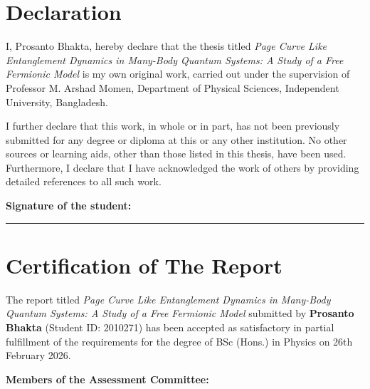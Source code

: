 \documentclass[12pt,oneside,openright]{report}
\theoremstyle{definition}
\theoremstyle{plain}
\theoremstyle{remark}
\begin{document}

\chapter*{Declaration}

I, Prosanto Bhakta, hereby declare that the thesis titled
\textit{Page Curve Like Entanglement Dynamics in Many-Body Quantum Systems: A Study of a Free Fermionic Model}
is my own original work, carried out under the supervision of Professor M. Arshad Momen,
Department of Physical Sciences, Independent University, Bangladesh.

I further declare that this work, in whole or in part, has not been previously submitted
for any degree or diploma at this or any other institution.
No other sources or learning aids, other than those listed in this thesis, have been used.
Furthermore, I declare that I have acknowledged the work of others by providing detailed references to all such work.

\vspace{2cm}

\noindent\begin{minipage}[t]{0.48\textwidth}
\textbf{Signature of the student:}\\[1.2cm]
\end{minipage}\hfill
\begin{minipage}[t]{0.40\textwidth}
\rule{0.9\linewidth}{0.4pt}
\end{minipage}

\cleardoublepage



\chapter*{Certification of The Report}

The report titled
\textit{Page Curve Like Entanglement Dynamics in Many-Body Quantum Systems: A Study of a Free Fermionic Model}
submitted by \textbf{Prosanto Bhakta} (Student ID: 2010271)
has been accepted as satisfactory in partial fulfillment of the requirements for the degree of
BSc (Hons.) in Physics on 26th February 2026.

\vspace{1cm}

\noindent\textbf{Members of the Assessment Committee:}
\end{document}
